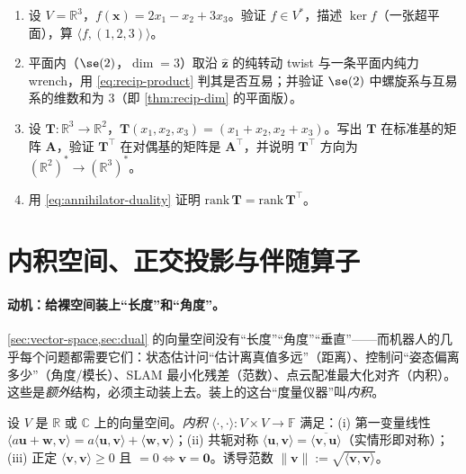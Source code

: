 \begin{practice}
\begin{enumerate}
  \item 设 $V=\mathbb{R}^3$，$f(\mathbf{x})=2x_1-x_2+3x_3$。验证 $f\in V^*$，描述 $\ker f$（一张超平面），算 $\langle f,(1,2,3)\rangle$。
  \item 平面内（$\se(2)$，$\dim=3$）取沿 $\hat{\mathbf{z}}$ 的纯转动 twist 与一条平面内纯力 wrench，用 \cref{eq:recip-product} 判其是否互易；并验证 $\se(2)$ 中螺旋系与互易系的维数和为 $3$（即 \cref{thm:recip-dim} 的平面版）。
  \item 设 $\mathbf{T}:\mathbb{R}^3\to\mathbb{R}^2$，$\mathbf{T}(x_1,x_2,x_3)=(x_1+x_2,x_2+x_3)$。写出 $\mathbf{T}$ 在标准基的矩阵 $\mathbf{A}$，验证 $\mathbf{T}^\top$ 在对偶基的矩阵是 $\mathbf{A}^\top$，并说明 $\mathbf{T}^\top$ 方向为 $(\mathbb{R}^2)^*\to(\mathbb{R}^3)^*$。
  \item 用 \cref{eq:annihilator-duality} 证明 $\mathrm{rank}\,\mathbf{T}=\mathrm{rank}\,\mathbf{T}^\top$。
\end{enumerate}
\end{practice}

\section{内积空间、正交投影与伴随算子}
\label{sec:inner-product}

\paragraph{动机：给裸空间装上“长度”和“角度”。}
\cref{sec:vector-space,sec:dual} 的向量空间没有“长度”“角度”“垂直”——而机器人的几乎每个问题都需要它们：状态估计问“估计离真值多远”（距离）、控制问“姿态偏离多少”（角度/模长）、SLAM 最小化残差（范数）、点云配准最大化对齐（内积）。这些是\emph{额外}结构，必须主动装上去。装上的这台“度量仪器”叫\emph{内积}。

\begin{definition}[内积空间]\label{def:inner-product}
设 $V$ 是 $\mathbb{R}$ 或 $\mathbb{C}$ 上的向量空间。\emph{内积} $\langle\cdot,\cdot\rangle:V\times V\to\mathbb{F}$ 满足：(i) 第一变量线性 $\langle a\mathbf{u}+\mathbf{w},\mathbf{v}\rangle=a\langle\mathbf{u},\mathbf{v}\rangle+\langle\mathbf{w},\mathbf{v}\rangle$；(ii) 共轭对称 $\langle\mathbf{u},\mathbf{v}\rangle=\overline{\langle\mathbf{v},\mathbf{u}\rangle}$（实情形即对称）；(iii) 正定 $\langle\mathbf{v},\mathbf{v}\rangle\ge0$ 且 $=0\iff\mathbf{v}=\mathbf{0}$。诱导范数 $\|\mathbf{v}\|:=\sqrt{\langle\mathbf{v},\mathbf{v}\rangle}$。
\end{definition}

